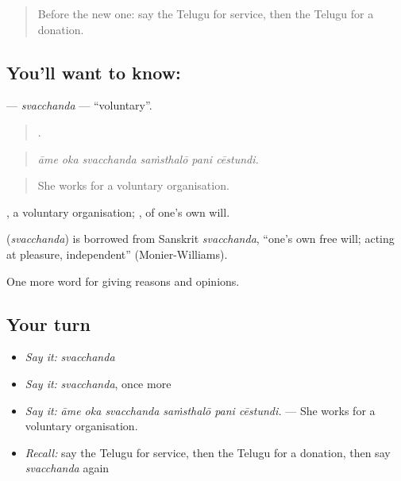 \label{lesson:TE-C410-svacchanda}



\begin{quote}
Before the new one: say the Telugu for service, then the Telugu for a donation.
\end{quote}

\subsection*{You'll want to know: }
\textbf{} — \emph{svacchanda} — \textquotedblleft{}voluntary\textquotedblright{}.

\begin{quote}
     .
\end{quote}

\begin{quote}
\emph{āme oka svacchanda saṁsthalō pani cēstundi.}
\end{quote}

\begin{quote}
She works for a voluntary organisation.
\end{quote}

 , a voluntary organisation; , of one’s own will.

\begin{cousinweb}
\textbf{} (\emph{svacchanda}) is borrowed from Sanskrit \emph{svacchanda}, \textquotedblleft{}one’s own free will; acting at pleasure, independent\textquotedblright{} (Monier-Williams).
\end{cousinweb}

\begin{grammarlens}[title={What you've built}]
One more word for giving reasons and opinions.
\end{grammarlens}

\subsection*{Your turn}
\begin{itemize}
\raggedright
  \item \emph{Say it:} \emph{svacchanda}
  \item \emph{Say it:} \emph{svacchanda}, once more
  \item \emph{Say it:} \emph{āme oka svacchanda saṁsthalō pani cēstundi.} — She works for a voluntary organisation.
  \item \emph{Recall:} say the Telugu for service, then the Telugu for a donation, then say \emph{svacchanda} again
\end{itemize}

